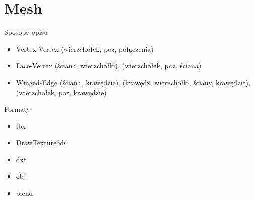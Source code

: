 \documentclass{article}
\begin{document}
\section{Mesh}
Sposoby opisu
\begin{itemize}
    \item Vertex-Vertex (wierzchołek, poz, połączenia)
    \item Face-Vertex (ściana, wierzchołki), (wierzchołek, poz, ściana)
    \item Winged-Edge (ściana, krawędzie), (krawędź, wierzchołki, ściany, krawędzie), (wierzchołek, poz, krawędzie)
\end{itemize}

Formaty:
\begin{itemize}
    \item fbx
    \item DrawTexture3ds
    \item dxf
    \item obj
    \item blend
\end{itemize}
\end{document}
